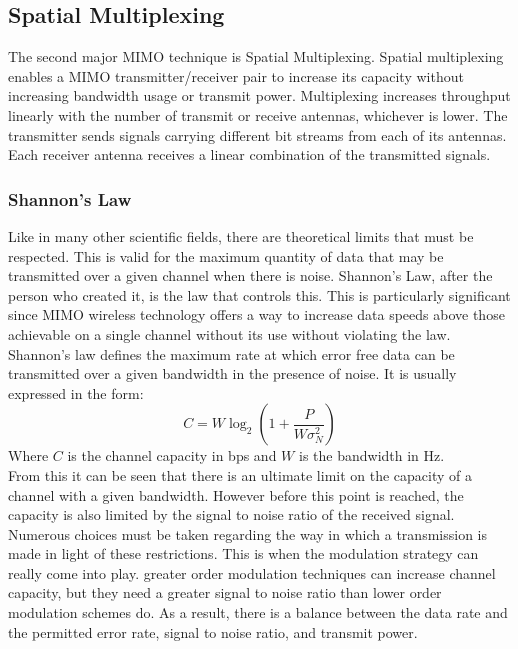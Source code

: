 \subsection{Spatial Multiplexing}
\label{subsection:MIMO-Multiplexing}
The second major MIMO technique is Spatial Multiplexing. Spatial multiplexing enables a MIMO transmitter/receiver pair to increase its capacity without increasing bandwidth usage or transmit power. Multiplexing increases throughput linearly with the number of transmit or receive antennas, whichever is lower. The transmitter sends signals carrying different bit streams from each of its antennas. Each receiver antenna receives a linear combination of the transmitted signals.
\subsubsection{Shannon's Law}
Like in many other scientific fields, there are theoretical limits that must be respected. This is valid for the maximum quantity of data that may be transmitted over a given channel when there is noise. Shannon's Law, after the person who created it, is the law that controls this. This is particularly significant since MIMO wireless technology offers a way to increase data speeds above those achievable on a single channel without its use without violating the law. \\
Shannon's law defines the maximum rate at which error free data can be transmitted over a given bandwidth in the presence of noise. It is usually expressed in the form:
\begin{equation}
    \label{eq:Shannon rate law}
    C = W \log_2 \left( 1 + \frac{P}{W \sigma_N^2} \right)
\end{equation}
Where $C$ is the channel capacity in bps and $W$ is the bandwidth in Hz.\\

From this it can be seen that there is an ultimate limit on the capacity of a channel with a given bandwidth. However before this point is reached, the capacity is also limited by the signal to noise ratio of the received signal.\\

Numerous choices must be taken regarding the way in which a transmission is made in light of these restrictions. This is when the modulation strategy can really come into play. greater order modulation techniques can increase channel capacity, but they need a greater signal to noise ratio than lower order modulation schemes do. As a result, there is a balance between the data rate and the permitted error rate, signal to noise ratio, and transmit power.\\
